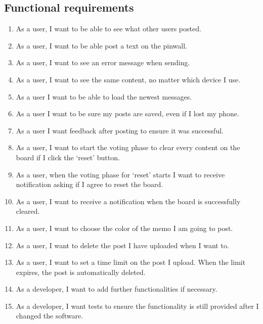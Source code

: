 \documentclass[conference]{IEEEtran}
\numberwithin{figure}{subsection}
\begin{document}
\subsection{Functional requirements}
\begin{enumerate}
 \item As a user, I want to be able to see what other users posted.\\
 \item As a user, I want to be able post a text on the pinwall.\\
 \item As a user, I want to see an error message when sending.\\
 \item As a user, I want to see the same content, no matter which device I use.\\
 \item As a user I want to be able to load the newest messages.\\
 \item As a user I want to be sure my posts are saved, even if I lost my phone.\\
 \item As a user I want feedback after posting to ensure it was successful.\\
 \item As a user, I want to start the voting phase to clear every content on the board if I click the ‘reset’ button.\\
 \item As a user, when the voting phase for ‘reset’ starts I want to receive notification asking if I agree to reset the board. \\
 \item As a user, I want to receive a notification when the board is successfully cleared.\\
 \item As a user, I want to choose the color of the memo I am going to post.\\
 \item As a user, I want to delete the post I have uploaded when I want to. \\
 \item As a user, I want to set a time limit on the post I upload. When the limit expires, the post is automatically deleted. \\
 \item As a developer, I want to add further functionalities if necessary.\\
 \item As a developer, I want tests to ensure the functionality is still provided after I changed the software.\\
 \end{enumerate}
\end{document}
